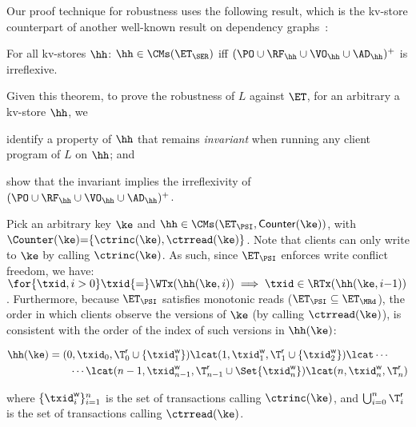 Our proof technique for robustness uses the following result, which is the kv-store counterpart of another well-known result on dependency graphs~\cite{adya}:
\begin{theorem}
\label{thm:serialisable_nocycle}
For all kv-stores $\hh$: $\hh \in \CMs(\ET_{\SER})$ iff $(\PO \cup \RF_{\hh} 
\cup \VO_{\hh} \cup \AD_{\hh})^{+}$ is irreflexive.
\end{theorem}
Given this theorem, to prove the robustness of $L$ against $\ET$, 
for an arbitrary a kv-store $\hh$, we 
\begin{enumerate*}
	\item identify a property of $\hh$ that remains \emph{invariant} when running any client program of $L$ on $\hh$; and 
	\item show that the invariant implies the irreflexivity of $(\PO \cup \RF_{\hh} \cup \VO_{\hh} \cup \AD_{\hh})^{+}$.
\end{enumerate*}

Pick an arbitrary key $\ke$ and $\hh \in \CMs(\ET_{\PSI}, \mathsf{Counter}(\ke))$, 
with $\Counter(\ke) {=} \{\ctrinc(\ke), \ctrread(\ke)\}$. 
Note that clients can only write to $\ke$ by calling $\ctrinc(\ke)$.
As such, since $\ET_{\PSI}$ enforces write conflict freedom, we have: 
$\for{\txid, i > 0} \txid {=} \WTx(\hh(\ke, i)) \implies \txid \in \RTx(\hh(\ke, i{-}1))$. 
Furthermore, because $\ET_{\PSI}$ satisfies monotonic reads ($\ET_{\PSI} \subseteq \ET_{\MRd}$),
the order in which clients observe the versions of $\ke$ (by calling $\ctrread(\ke)$), 
is consistent with the order of the index of such versions in $\hh(\ke)$:
%

\vspace*{-11pt}
{\small%
\begin{align*}
	\hh(\ke) & = (0, \txid_{0}, \T^{\mathsf{r}}_{0} \cup \{\txid^{\mathsf{w}}_1\}) 
	\lcat (1, \txid^{\mathsf{w}}_{1}, \T^{\mathsf{r}}_{1} \cup \{\txid^{\mathsf{w}}_2\}) 
	\lcat \cdots  \\
	& \qquad \cdots \lcat (n-1, \txid^{\mathsf{w}}_{n-1}, \T^{\mathsf{r}}_{n-1} \cup \Set{\txid^{\mathsf{w}}_n})
	\lcat (n, \txid^{\mathsf{w}}_n, \T^{\mathsf{r}}_{n})
\end{align*}%
}%
%
\vspace*{-13pt}

\noindent where $\{\txid^{\mathsf{w}}_{i}\}_{i=1}^{n}$ is the set of transactions calling $\ctrinc(\ke)$, 
and $\bigcup_{i=0}^{n} \T^{\mathsf{r}}_{i}$ is the set of transactions calling $\ctrread(\ke)$. 


